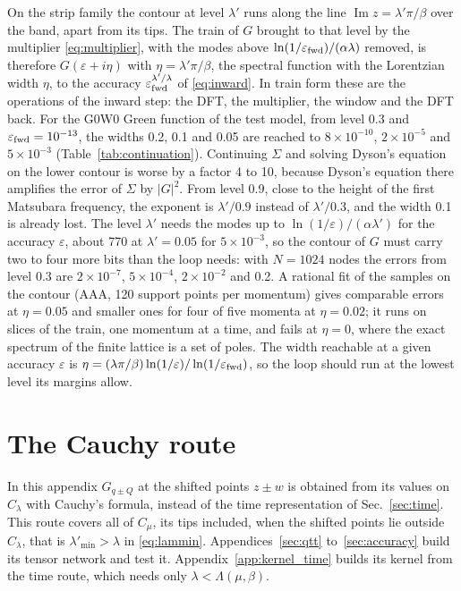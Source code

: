 \documentclass[aps,prb,reprint,a4paper]{revtex4-2}
\DeclareMathOperator{\Imag}{Im}
\begin{document}
On the strip family the contour at level $\lambda'$ runs along the line $\Imag z=\lambda'\pi/\beta$ over the band, apart from its tips. The train of $G$ brought to that level by the multiplier \eqref{eq:multiplier}, with the modes above $\ln(1/\varepsilon_{\rm fwd})/(\alpha\lambda)$ removed, is therefore $G(\varepsilon+i\eta)$ with $\eta=\lambda'\pi/\beta$, the spectral function with the Lorentzian width $\eta$, to the accuracy $\varepsilon_{\rm fwd}^{\lambda'/\lambda}$ of \eqref{eq:inward}. In train form these are the operations of the inward step: the DFT, the multiplier, the window and the DFT back. For the G0W0 Green function of the test model, from level 0.3 and $\varepsilon_{\rm fwd}=10^{-13}$, the widths 0.2, 0.1 and 0.05 are reached to $8\times10^{-10}$, $2\times10^{-5}$ and $5\times10^{-3}$ (Table~\ref{tab:continuation}). Continuing $\Sigma$ and solving Dyson's equation on the lower contour is worse by a factor 4 to 10, because Dyson's equation there amplifies the error of $\Sigma$ by $\lvert G\rvert^2$. From level 0.9, close to the height of the first Matsubara frequency, the exponent is $\lambda'/0.9$ instead of $\lambda'/0.3$, and the width 0.1 is already lost. The level $\lambda'$ needs the modes up to $\ln(1/\varepsilon)/(\alpha\lambda')$ for the accuracy $\varepsilon$, about 770 at $\lambda'=0.05$ for $5\times10^{-3}$, so the contour of $G$ must carry two to four more bits than the loop needs: with $N=1024$ nodes the errors from level 0.3 are $2\times10^{-7}$, $5\times10^{-4}$, $2\times10^{-2}$ and 0.2. A rational fit of the samples on the contour (AAA, 120 support points per momentum) gives comparable errors at $\eta=0.05$ and smaller ones for four of five momenta at $\eta=0.02$; it runs on slices of the train, one momentum at a time, and fails at $\eta=0$, where the exact spectrum of the finite lattice is a set of poles. The width reachable at a given accuracy $\varepsilon$ is $\eta=(\lambda\pi/\beta)\ln(1/\varepsilon)/\ln(1/\varepsilon_{\rm fwd})$, so the loop should run at the lowest level its margins allow.

\appendix

\section{The Cauchy route}
\label{app:cauchy}

In this appendix $G_{q\pm Q}$ at the shifted points $z\pm w$ is obtained from its values on $C_\lambda$ with Cauchy's formula, instead of the time representation of Sec.~\ref{sec:time}. This route covers all of $C_\mu$, its tips included, when the shifted points lie outside $C_\lambda$, that is $\lambda'_{\min}>\lambda$ in \eqref{eq:lammin}. Appendices~\ref{sec:qtt} to~\ref{sec:accuracy} build its tensor network and test it. Appendix~\ref{app:kernel_time} builds its kernel from the time route, which needs only $\lambda<\Lambda(\mu,\beta)$.
\end{document}
